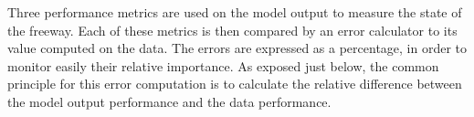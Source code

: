 Three performance metrics are used on the model output to measure the state of the freeway. Each of these metrics is then compared by an error calculator to its value computed on the data.
The errors are expressed as a percentage, in order to monitor easily their relative importance. As exposed just below, the common principle for this error computation is to calculate the relative difference between the model output performance and the data performance.\\